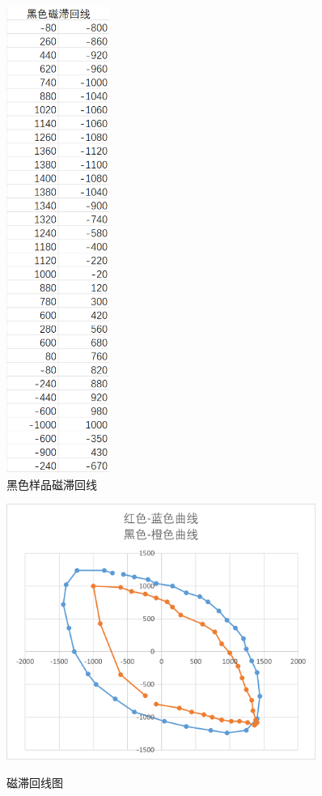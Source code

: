 \documentclass{ctexart}
\begin{document}
\begin{figure}[H]
\begin{minipage}[t]{0.45\textwidth}
    \includegraphics[width=0.3\textwidth,height=0.8\textheight]{heiseqvxianshujv.png}
    \caption{黑色样品磁滞回线}
    \label{heiseshujv}
  \end{minipage}
\end{figure}
\newpage

\begin{figure}[H]
  \centering \label{cizhihuixianzuotu}
  \includegraphics[width=0.9\textwidth,height=0.5\textheight]{zuotu.png}
  \caption{磁滞回线图}
\end{figure}
\end{document}
